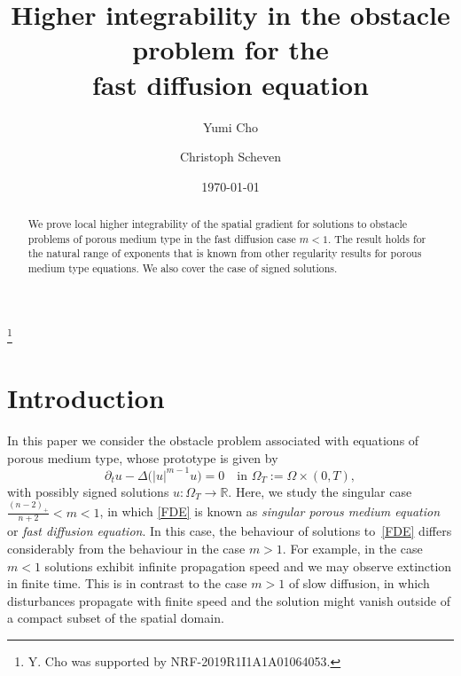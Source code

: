 \documentclass[a4paper, 10pt, american]{amsart}
\numberwithin{theorem}{section}
\numberwithin{equation}{section}
\def\R{\mathbb{R}}
\begin{document}
\title[Higher integrability in the obstacle problem for the fast diffusion equation]{Higher integrability in the obstacle problem for the\\ fast diffusion equation}
\date{\today}

\author[Y. Cho]{Yumi Cho}
\address{Yumi Cho\\
Department of Mathematical Sciences, Seoul National University\\
08826 Seoul, Republic of Korea}

\author[C. Scheven]{Christoph Scheven}
\address{Christoph Scheven\\ Fakult\"at f\"ur Mathematik, 
Universit\"at Duisburg-Essen\\45117 Essen, Germany}

\thanks{Y. Cho was supported by NRF-2019R1I1A1A01064053.}


\maketitle



\begin{abstract}
 We prove local higher integrability of the spatial
 gradient for solutions to obstacle problems of porous medium type in
 the fast diffusion case $m<1$. The result holds for the natural range
 of exponents that is known from other regularity results for
 porous medium type equations. We also
 cover the case of signed solutions. 
\end{abstract}



\section{Introduction}
In this paper we consider the obstacle problem associated with equations
of porous medium type, whose prototype is given by 
\begin{equation}\label{FDE}
  \partial_t u - \Delta\big(|u|^{m-1}u\big) = 0
  \quad\mbox{in }\Omega_T:=\Omega\times(0,T),
\end{equation}
with possibly signed solutions $u:\Omega_T\to\R$.
Here, we study the singular case $\frac{(n-2)_+}{n+2}<m<1$,
in which \eqref{FDE} is known as \emph{singular porous medium
  equation} or \emph{fast diffusion equation}.
In this case, the behaviour of solutions to~\eqref{FDE} differs
considerably from the behaviour in the case $m>1$.
For example, in the case $m<1$
solutions exhibit infinite propagation speed and we may observe extinction in finite time.
This is in contrast to the case $m>1$ of slow diffusion, in which 
disturbances propagate with finite speed and the solution
might vanish outside of a compact subset of the spatial domain.
\end{document}
